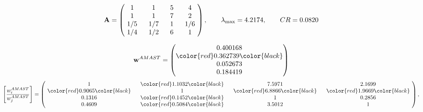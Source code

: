 \begin{example}
\begin{equation*}
\mathbf{A} =
\begin{pmatrix}
$\,\,$ 1 $\,\,$ & $\,\,$1$\,\,$ & $\,\,$5$\,\,$ & $\,\,$4 $\,\,$ \\
$\,\,$ 1 $\,\,$ & $\,\,$ 1 $\,\,$ & $\,\,$7$\,\,$ & $\,\,$2 $\,\,$ \\
$\,\,$ 1/5$\,\,$ & $\,\,$ 1/7$\,\,$ & $\,\,$ 1 $\,\,$ & $\,\,$ 1/6 $\,\,$ \\
$\,\,$ 1/4$\,\,$ & $\,\,$ 1/2$\,\,$ & $\,\,$6$\,\,$ & $\,\,$ 1  $\,\,$ \\
\end{pmatrix},
\qquad
\lambda_{\max} =
4.2174,
\qquad
CR = 0.0820
\end{equation*}

\begin{equation*}
\mathbf{w}^{AMAST} =
\begin{pmatrix}
0.400168\\
\color{red} 0.362739\color{black} \\
0.052673\\
0.184419
\end{pmatrix}\end{equation*}
\begin{equation*}
\left[ \frac{{w}^{AMAST}_i}{{w}^{AMAST}_j} \right] =
\begin{pmatrix}
$\,\,$ 1 $\,\,$ & $\,\,$\color{red} 1.1032\color{black} $\,\,$ & $\,\,$7.5971$\,\,$ & $\,\,$2.1699$\,\,$ \\
$\,\,$\color{red} 0.9065\color{black} $\,\,$ & $\,\,$ 1 $\,\,$ & $\,\,$\color{red} 6.8866\color{black} $\,\,$ & $\,\,$\color{red} 1.9669\color{black}   $\,\,$ \\
$\,\,$0.1316$\,\,$ & $\,\,$\color{red} 0.1452\color{black} $\,\,$ & $\,\,$ 1 $\,\,$ & $\,\,$0.2856 $\,\,$ \\
$\,\,$0.4609$\,\,$ & $\,\,$\color{red} 0.5084\color{black} $\,\,$ & $\,\,$3.5012$\,\,$ & $\,\,$ 1  $\,\,$ \\
\end{pmatrix},
\end{equation*}


\end{example}
